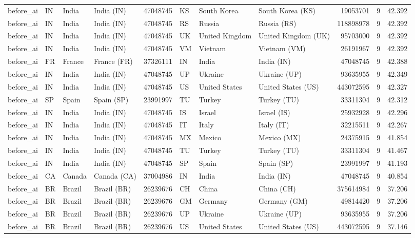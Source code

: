 \begin{tabular}{llllrlllrrr}
before\_ai & IN & India & India (IN) & 47048745 & KS & South Korea & South Korea (KS) & 19053701 & 9 & 42.392 \\
before\_ai & IN & India & India (IN) & 47048745 & RS & Russia & Russia (RS) & 118898978 & 9 & 42.392 \\
before\_ai & IN & India & India (IN) & 47048745 & UK & United Kingdom & United Kingdom (UK) & 95703000 & 9 & 42.392 \\
before\_ai & IN & India & India (IN) & 47048745 & VM & Vietnam & Vietnam (VM) & 26191967 & 9 & 42.392 \\
before\_ai & FR & France & France (FR) & 37326111 & IN & India & India (IN) & 47048745 & 9 & 42.388 \\
before\_ai & IN & India & India (IN) & 47048745 & UP & Ukraine & Ukraine (UP) & 93635955 & 9 & 42.349 \\
before\_ai & IN & India & India (IN) & 47048745 & US & United States & United States (US) & 443072595 & 9 & 42.327 \\
before\_ai & SP & Spain & Spain (SP) & 23991997 & TU & Turkey & Turkey (TU) & 33311304 & 9 & 42.312 \\
before\_ai & IN & India & India (IN) & 47048745 & IS & Israel & Israel (IS) & 25932928 & 9 & 42.296 \\
before\_ai & IN & India & India (IN) & 47048745 & IT & Italy & Italy (IT) & 32215511 & 9 & 42.267 \\
before\_ai & IN & India & India (IN) & 47048745 & MX & Mexico & Mexico (MX) & 24375915 & 9 & 41.854 \\
before\_ai & IN & India & India (IN) & 47048745 & TU & Turkey & Turkey (TU) & 33311304 & 9 & 41.467 \\
before\_ai & IN & India & India (IN) & 47048745 & SP & Spain & Spain (SP) & 23991997 & 9 & 41.193 \\
before\_ai & CA & Canada & Canada (CA) & 37004986 & IN & India & India (IN) & 47048745 & 9 & 40.854 \\
before\_ai & BR & Brazil & Brazil (BR) & 26239676 & CH & China & China (CH) & 375614984 & 9 & 37.206 \\
before\_ai & BR & Brazil & Brazil (BR) & 26239676 & GM & Germany & Germany (GM) & 49814420 & 9 & 37.206 \\
before\_ai & BR & Brazil & Brazil (BR) & 26239676 & UP & Ukraine & Ukraine (UP) & 93635955 & 9 & 37.206 \\
before\_ai & BR & Brazil & Brazil (BR) & 26239676 & US & United States & United States (US) & 443072595 & 9 & 37.146 \\

\end{tabular}
